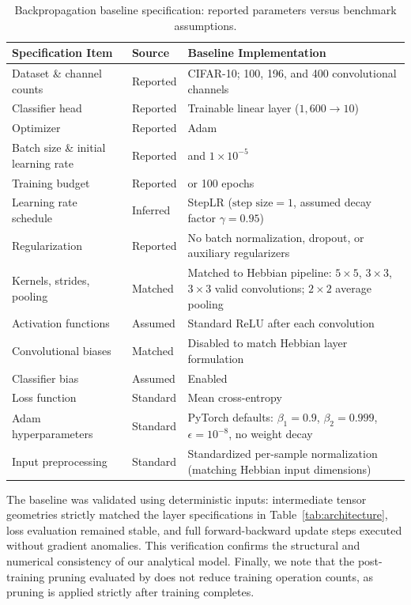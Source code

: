 \documentclass{article}
\begin{document}
\begin{table}[t]
\centering
\small
\renewcommand{\arraystretch}{1.15}
\caption{Backpropagation baseline specification: reported parameters versus benchmark assumptions.}
\label{tab:bp_assumptions}
\begin{tabularx}{\textwidth}{l l >{\raggedright\arraybackslash}X}
\toprule
Specification Item & Source & Baseline Implementation \\
\midrule
Dataset \& channel counts & Reported & CIFAR-10; 100, 196, and 400 convolutional channels \\
Classifier head & Reported & Trainable linear layer ($1{,}600 \to 10$) \\
Optimizer & Reported & Adam \\
Batch size \& initial learning rate & Reported & 100 and $1\times 10^{-5}$ \\
Training budget & Reported & 20 or 100 epochs \\
Learning rate schedule & Inferred & StepLR ($\text{step size}=1$, assumed decay factor $\gamma = 0.95$) \\
Regularization & Reported & No batch normalization, dropout, or auxiliary regularizers \\
Kernels, strides, pooling & Matched & Matched to Hebbian pipeline: $5\times 5$, $3\times 3$, $3\times 3$ valid convolutions; $2\times 2$ average pooling \\
Activation functions & Assumed & Standard ReLU after each convolution \\
Convolutional biases & Matched & Disabled to match Hebbian layer formulation \\
Classifier bias & Assumed & Enabled \\
Loss function & Standard & Mean cross-entropy \\
Adam hyperparameters & Standard & PyTorch defaults: $\beta_1=0.9$, $\beta_2=0.999$, $\epsilon=10^{-8}$, no weight decay \\
Input preprocessing & Standard & Standardized per-sample normalization (matching Hebbian input dimensions) \\
\bottomrule
\end{tabularx}
\end{table}

The baseline was validated using deterministic inputs: intermediate tensor geometries strictly matched the layer specifications in Table~\ref{tab:architecture}, loss evaluation remained stable, and full forward-backward update steps executed without gradient anomalies. This verification confirms the structural and numerical consistency of our analytical model. Finally, we note that the post-training pruning evaluated by \citet{gupta2023bio} does not reduce training operation counts, as pruning is applied strictly after training completes.
\end{document}
